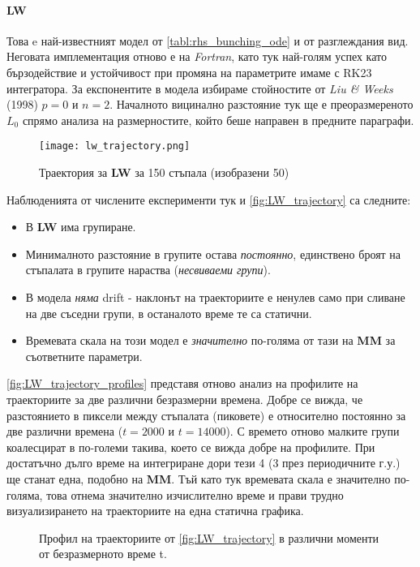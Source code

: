 \paragraph{LW} Това e най-известният модел от \autoref{tabl:rhs_bunching_ode} и от разглеждания вид. Неговата имплементация отново е на \textit{Fortran}, като тук най-голям успех като бързодействие и устойчивост при промяна на параметрите имаме с RK23 интегратора. За експонентите в модела избираме стойностите от \textit{Liu \& Weeks} (1998) \cite{Liu1998} $p = 0$ и $n = 2$. Началното вицинално разстояние тук ще е преоразмереното $L_0$ спрямо анализа на размерностите, който беше направен в предните параграфи.
\begin{figure}[htbp]
	\centering
	\texttt{[image: lw\_trajectory.png]}
	\caption{Траектория за \textbf{LW} за 150 стъпала (изобразени 50)}
	\label{fig:LW_trajectory}
\end{figure}
Наблюденията от числените експерименти тук и \autoref{fig:LW_trajectory} са следните: 
\begin{itemize}
    \item В \textbf{LW} има групиране.
    \item Минималното разстояние в групите остава \textit{постоянно}, единствено броят на стъпалата в групите нараства (\textit{несвиваеми групи}).
    \item В модела \textit{няма} drift - наклонът на траекториите е ненулев само при сливане на две съседни групи, в останалото време те са статични.
    \item Времевата скала на този модел е \textit{значително} по-голяма от тази на \textbf{MM} за съответните параметри.
\end{itemize}
\autoref{fig:LW_trajectory_profiles} представя отново анализ на профилите на траекториите за две различни безразмерни времена. Добре се вижда, че разстоянието в пиксели между стъпалата (пиковете) е относително постоянно за две различни времена ($t = 2000$ и $t = 14000$). С времето отново малките групи коалесцират в по-големи такива, което се вижда добре на профилите. При достатъчно дълго време на интегриране дори тези 4 (3 през периодичните г.у.) ще станат една, подобно на \textbf{MM}. Тъй като тук времевата скала е значително по-голяма, това отнема значително изчислително време и прави трудно визуализирането на траекториите на една статична графика.
\begin{figure}[hbpt]
    \centering
    \caption{Профил на траекториите от \autoref{fig:LW_trajectory} в различни моменти от безразмерното време t.}
    \label{fig:LW_trajectory_profiles}
\end{figure}

